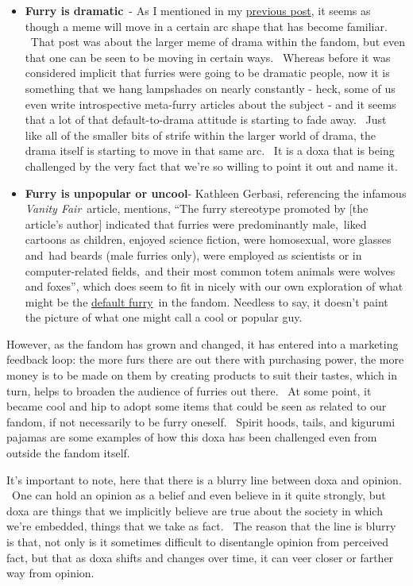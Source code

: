 \begin{itemize}
\item
  \textbf{Furry is dramatic}~- As I mentioned in my
  \href{http://adjectivespecies.com/2012/02/29/the-dramagogues-episode-3-making-waves/}{previous
  post}, it seems as though a meme will move in a certain arc shape that
  has become familiar. ~That post was about the larger meme of drama
  within the fandom, but even that one can be seen to be moving in
  certain ways. ~Whereas before it was considered implicit that furries
  were going to be dramatic people, now it is something that we hang
  lampshades on nearly constantly - heck, some of us even write
  introspective meta-furry articles about the subject - and it seems
  that a lot of that default-to-drama attitude is starting to fade away.
  ~Just like all of the smaller bits of strife within the larger world
  of drama, the drama itself is starting to move in that same arc. ~It
  is a doxa that is being challenged by the very fact that we're so
  willing to point it out and name it.
\item
  \textbf{Furry is unpopular or uncool}- Kathleen Gerbasi, referencing
  the infamous \emph{Vanity Fair}~article, mentions, ``The furry
  stereotype promoted by {[}the article's author{]} indicated that
  furries were predominantly male,~liked cartoons as children, enjoyed
  science fiction, were homosexual, wore glasses and~had beards (male
  furries only), were employed as scientists or in computer-related
  fields,~and their most common totem animals were wolves and foxes'',
  which does seem to fit in nicely with our own exploration of what
  might be the
  \href{http://adjectivespecies.com/2011/11/09/the-default-furry/}{default
  furry}~in the fandom. Needless to say, it doesn't paint the picture of
  what one might call a cool or popular guy.
\end{itemize}

However, as the fandom has grown and changed, it has entered into a
marketing feedback loop: the more furs there are out there with
purchasing power, the more money is to be made on them by creating
products to suit their tastes, which in turn, helps to broaden the
audience of furries out there. ~At some point, it became cool and hip to
adopt some items that could be seen as related to our fandom, if not
necessarily to be furry oneself. ~Spirit hoods, tails, and kigurumi
pajamas are some examples of how this doxa has been challenged even from
outside the fandom itself.

It's important to note, here that there is a blurry line between doxa
and opinion. ~One can hold an opinion as a belief and even believe in it
quite strongly, but doxa are things that we implicitly believe are true
about the society in which we're embedded, things that we take as fact.
~The reason that the line is blurry is that, not only is it sometimes
difficult to disentangle opinion from perceived fact, but that as doxa
shifts and changes over time, it can veer closer or farther way from
opinion.

